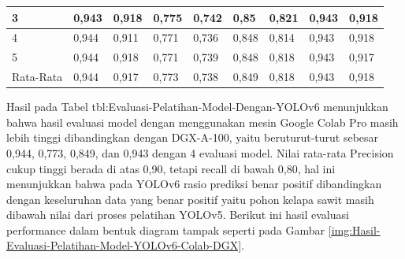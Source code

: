 \begin{singlespace}
\begin{table}[H]
\begin{tabular}{|p{1cm}|p{1cm}p{1cm}|p{1cm}p{1cm}|p{1cm}p{1cm}|p{1cm}p{1cm}|}
			3                                              & \multicolumn{1}{p{1cm}|}{0,943}                                    & 0,918     & \multicolumn{1}{p{1cm}|}{0,775}                                    & 0,742     & \multicolumn{1}{p{1cm}|}{0,85}                                     & 0,821     & \multicolumn{1}{p{1cm}|}{0,943}                                     & 0,918     \\ \hline
			
			4                                              & \multicolumn{1}{p{1cm}|}{0,944}                                    & 0,911     & \multicolumn{1}{p{1cm}|}{0,771}                                    & 0,736     & \multicolumn{1}{p{1cm}|}{0,848}                                    & 0,814     & \multicolumn{1}{p{1cm}|}{0,943}                                     & 0,918     \\ \hline
			
			5                                              & \multicolumn{1}{p{1cm}|}{0,944}                                    & 0,918     & \multicolumn{1}{p{1cm}|}{0,771}                                    & 0,739     & \multicolumn{1}{p{1cm}|}{0,848}                                    & 0,818     & \multicolumn{1}{p{1cm}|}{0,943}                                     & 0,917     \\ \hline
			
			Rata-Rata                                      & \multicolumn{1}{p{1cm}|}{0,944}                                    & 0,917     & \multicolumn{1}{p{1cm}|}{0,773}                                    & 0,738     & \multicolumn{1}{p{1cm}|}{0,849}                                    & 0,818     & \multicolumn{1}{p{1cm}|}{0,943}                                     & 0,918     \\ \hline
		\end{tabular}
	\end{table}
\end{singlespace}

Hasil pada Tabel tbl:Evaluasi-Pelatihan-Model-Dengan-YOLOv6 menunjukkan bahwa hasil evaluasi model dengan menggunakan mesin Google Colab Pro masih lebih tinggi dibandingkan dengan DGX-A-100, yaitu beruturut-turut sebesar 0,944, 0,773, 0,849, dan 0,943 dengan 4 evaluasi model. Nilai rata-rata Precision cukup tinggi berada di atas 0,90, tetapi recall di bawah 0,80, hal ini menunjukkan bahwa pada YOLOv6 rasio prediksi benar positif dibandingkan dengan keseluruhan data yang benar positif yaitu pohon kelapa sawit masih dibawah nilai dari proses pelatihan YOLOv5. Berikut ini hasil evaluasi performance dalam bentuk diagram tampak seperti pada Gambar \ref{img:Hasil-Evaluasi-Pelatihan-Model-YOLOv6-Colab-DGX}.


